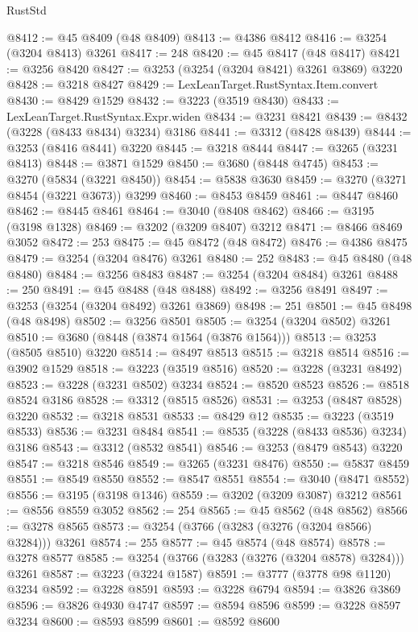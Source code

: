 \begin{lexlean}{RustStd}
\begin{coremodule}
@8412 := @45 @8409 (@48 @8409)
@8413 := @4386 @8412
@8416 := @3254 (@3204 @8413) @3261
@8417 := 248
@8420 := @45 @8417 (@48 @8417)
@8421 := @3256 @8420
@8427 := @3253 (@3254 (@3204 @8421) @3261 @3869) @3220
@8428 := @3218 @8427
@8429 := LexLeanTarget.RustSyntax.Item.convert
@8430 := @8429 @1529
@8432 := @3223 (@3519 @8430)
@8433 := LexLeanTarget.RustSyntax.Expr.widen
@8434 := @3231 @8421
@8439 := @8432 (@3228 (@8433 @8434) @3234) @3186
@8441 := @3312 (@8428 @8439)
@8444 := @3253 (@8416 @8441) @3220
@8445 := @3218 @8444
@8447 := @3265 (@3231 @8413)
@8448 := @3871 @1529
@8450 := @3680 (@8448 @4745)
@8453 := @3270 (@5834 (@3221 @8450))
@8454 := @5838 @3630
@8459 := @3270 (@3271 @8454 (@3221 @3673)) @3299
@8460 := @8453 @8459
@8461 := @8447 @8460
@8462 := @8445 @8461
@8464 := @3040 (@8408 @8462)
@8466 := @3195 (@3198 @1328)
@8469 := @3202 (@3209 @8407) @3212
@8471 := @8466 @8469 @3052
@8472 := 253
@8475 := @45 @8472 (@48 @8472)
@8476 := @4386 @8475
@8479 := @3254 (@3204 @8476) @3261
@8480 := 252
@8483 := @45 @8480 (@48 @8480)
@8484 := @3256 @8483
@8487 := @3254 (@3204 @8484) @3261
@8488 := 250
@8491 := @45 @8488 (@48 @8488)
@8492 := @3256 @8491
@8497 := @3253 (@3254 (@3204 @8492) @3261 @3869)
@8498 := 251
@8501 := @45 @8498 (@48 @8498)
@8502 := @3256 @8501
@8505 := @3254 (@3204 @8502) @3261
@8510 := @3680 (@8448 (@3874 @1564 (@3876 @1564)))
@8513 := @3253 (@8505 @8510) @3220
@8514 := @8497 @8513
@8515 := @3218 @8514
@8516 := @3902 @1529
@8518 := @3223 (@3519 @8516)
@8520 := @3228 (@3231 @8492)
@8523 := @3228 (@3231 @8502) @3234
@8524 := @8520 @8523
@8526 := @8518 @8524 @3186
@8528 := @3312 (@8515 @8526)
@8531 := @3253 (@8487 @8528) @3220
@8532 := @3218 @8531
@8533 := @8429 @12
@8535 := @3223 (@3519 @8533)
@8536 := @3231 @8484
@8541 := @8535 (@3228 (@8433 @8536) @3234) @3186
@8543 := @3312 (@8532 @8541)
@8546 := @3253 (@8479 @8543) @3220
@8547 := @3218 @8546
@8549 := @3265 (@3231 @8476)
@8550 := @5837 @8459
@8551 := @8549 @8550
@8552 := @8547 @8551
@8554 := @3040 (@8471 @8552)
@8556 := @3195 (@3198 @1346)
@8559 := @3202 (@3209 @3087) @3212
@8561 := @8556 @8559 @3052
@8562 := 254
@8565 := @45 @8562 (@48 @8562)
@8566 := @3278 @8565
@8573 := @3254 (@3766 (@3283 (@3276 (@3204 @8566) @3284))) @3261
@8574 := 255
@8577 := @45 @8574 (@48 @8574)
@8578 := @3278 @8577
@8585 := @3254 (@3766 (@3283 (@3276 (@3204 @8578) @3284))) @3261
@8587 := @3223 (@3224 @1587)
@8591 := @3777 (@3778 @98 @1120) @3234
@8592 := @3228 @8591
@8593 := @3228 @6794
@8594 := @3826 @3869
@8596 := @3826 @4930 @4747
@8597 := @8594 @8596
@8599 := @3228 @8597 @3234
@8600 := @8593 @8599
@8601 := @8592 @8600

\end{coremodule}
\end{lexlean}
